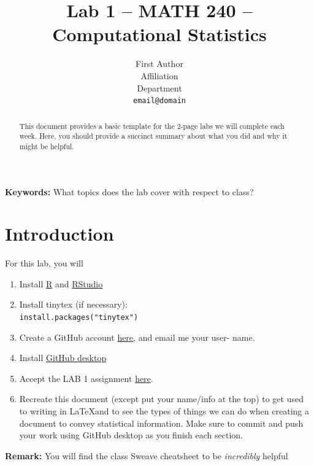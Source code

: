 \documentclass{article}\usepackage[]{graphicx}\usepackage[]{xcolor}
\begin{document}
\vspace{-1in}
\title{Lab 1 -- MATH 240 -- Computational Statistics}

\author{
  First Author \\
  Affiliation  \\
  Department  \\
  {\tt email@domain}
}

\date{}

\maketitle

\begin{multicols}{2}
\begin{abstract}
This document provides a basic template for the 2-page labs we will complete each week. Here, you should provide a succinct summary about what you did and why it might be helpful.
\end{abstract}

\noindent \textbf{Keywords:} What topics does the lab cover with respect to class?

\section{Introduction}
For this lab, you will
\begin{enumerate}
  \item Install \href{https://cran.rstudio.com/}{R} and \href{https://posit.co/download/rstudio-desktop/}{RStudio}
  \item Install tinytex (if necessary):\\ \texttt{install.packages("tinytex")}
  \item Create a GitHub account \href{https://github.com/}{here}, and email me your user- name.
  \item Install \href{https://desktop.github.com/}{GitHub desktop}
  \item Accept the LAB 1 assignment \href{https://classroom.github.com/a/gfC_xMMl}{here}.
  \item Recreate this document (except put your name/info at the top) to get used to writing in \LaTeX and to see the types of things we can do when creating a document to convey statistical information. Make sure to commit and push your work using GitHub desktop as you finish each section.
\end{enumerate}
\textbf{Remark:} You will find the class Sweave cheatsheet to be \emph{incredibly} helpful


\end{multicols}
\end{document}
